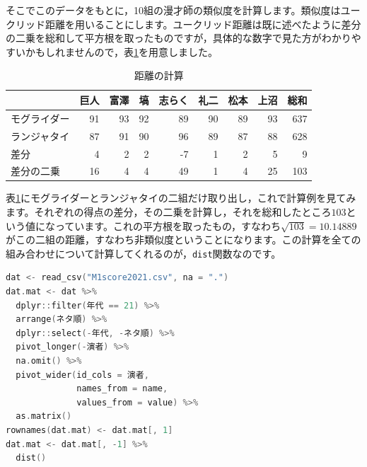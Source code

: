 \documentclass{ltjsbook}
\begin{document}
そこでこのデータをもとに，10組の漫才師の類似度を計算します。類似度はユークリッド距離を用いることにします。ユークリッド距離は既に述べたように差分の二乗を総和して平方根を取ったものですが，具体的な数字で見た方がわかりやすいかもしれませんので，表\ref{tbl:15_03}を用意しました。
\begin{table}[ht]
	\centering
	\caption{距離の計算}
	\begin{tabular}{l|rrrrrrrr}
		\hline
		       & 巨人 & 富澤 & 塙  & 志らく & 礼二 & 松本 & 上沼 & 総和  \\
		\hline
		モグライダー & 91 & 93 & 92 & 89  & 90 & 89 & 93 & 637 \\
		ランジャタイ & 87 & 91 & 90 & 96  & 89 & 87 & 88 & 628 \\
		\hline
		差分     & 4  & 2  & 2  & -7  & 1  & 2  & 5  & 9   \\
		差分の二乗  & 16 & 4  & 4  & 49  & 1  & 4  & 25 & 103 \\
		\hline
	\end{tabular}
	\label{tbl:15_03}
\end{table}
表\ref{tbl:15_03}にモグライダーとランジャタイの二組だけ取り出し，これで計算例を見てみます。それぞれの得点の差分，その二乗を計算し，それを総和したところ$103$という値になっています。これの平方根を取ったもの，すなわち$\sqrt{103}=10.14889$がこの二組の距離，すなわち非類似度ということになります。この計算を全ての組み合わせについて計算してくれるのが，\verb|dist|関数なのです。

\begin{lstlisting}[language=C++,label={code:15_02},caption={距離行列の計算}]
dat <- read_csv("M1score2021.csv", na = ".")
dat.mat <- dat %>%
  dplyr::filter(年代 == 21) %>%
  arrange(ネタ順) %>% 
  dplyr::select(-年代, -ネタ順) %>%
  pivot_longer(-演者) %>%
  na.omit() %>%
  pivot_wider(id_cols = 演者, 
  			  names_from = name,
			  values_from = value) %>%
  as.matrix()
rownames(dat.mat) <- dat.mat[, 1]
dat.mat <- dat.mat[, -1] %>%
  dist()
\end{lstlisting}
\end{document}
